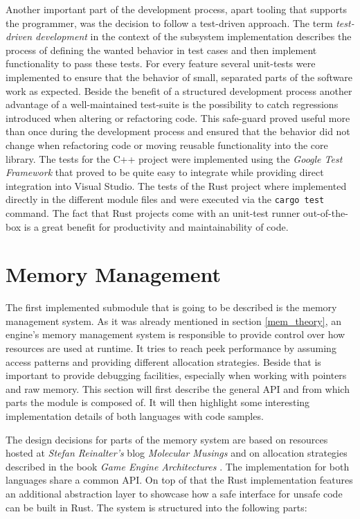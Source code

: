 Another important part of the development process, apart tooling that supports the programmer, was the decision to follow a test-driven approach. The term \textit{test-driven development} in the context of the subsystem implementation describes the process of defining the wanted behavior in test cases and then implement functionality to pass these tests. For every feature several unit-tests were implemented to ensure that the behavior of small, separated parts of the software work as expected. Beside the benefit of a structured development process another advantage of a well-maintained test-suite is the possibility to catch regressions introduced when altering or refactoring code. This safe-guard proved useful more than once during the development process and ensured that the behavior did not change when refactoring code or moving reusable functionality into the core library. The tests for the C++ project were implemented using the \textit{Google Test Framework} that proved to be quite easy to integrate while providing direct integration into Visual Studio. The tests of the Rust project where implemented directly in the different module files and were executed via the \texttt{cargo test} command. The fact that Rust projects come with an unit-test runner out-of-the-box is a great benefit for productivity and maintainability of code. 

\section{Memory Management} \label{mem_impl}

The first implemented submodule that is going to be described is the memory management system. As it was already mentioned in section \ref{mem_theory}, an engine's memory management system is responsible to provide control over how resources are used at runtime. It tries to reach peek performance by assuming access patterns and providing different allocation strategies. Beside that is important to provide debugging facilities, especially when working with pointers and raw memory. This section will first describe the general \ac{API} and from which parts the module is composed of. It will then highlight some interesting implementation details of both languages with code samples.

The design decisions for parts of the memory system are based on resources hosted at \textit{Stefan Reinalter's} blog \textit{Molecular Musings} \cite{MOL_MS_1} \cite{MOL_MS_2} \cite{MOL_MS_3} \cite{MOL_MS_4} \cite{MOL_MS_5} and on allocation strategies described in the book \textit{Game Engine Architectures} \cite{GEA_2}. The implementation for both languages share a common \ac{API}. On top of that the Rust implementation features an additional abstraction layer to showcase how a safe interface for unsafe code can be built in Rust. The system is structured into the following parts:

